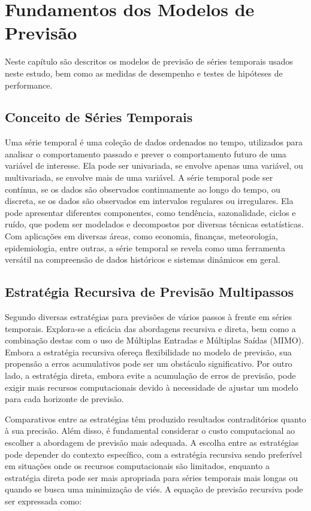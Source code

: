 \section{Fundamentos dos Modelos de Previs\~ao}\label{sec:base}

 Neste capítulo são descritos os modelos de previsão de séries temporais usados neste estudo, bem como as medidas de desempenho e testes de hipóteses de performance. 
 
 \subsection{Conceito de S\'eries Temporais}
 
Uma série temporal é uma coleção de dados ordenados no tempo, utilizados para analisar o comportamento passado e prever o comportamento futuro de uma variável de interesse. Ela pode ser univariada, se envolve apenas uma variável, ou multivariada, se envolve mais de uma variável. A série temporal pode ser contínua, se os dados são observados continuamente ao longo do tempo, ou discreta, se os dados são observados em intervalos regulares ou irregulares. Ela pode apresentar diferentes componentes, como tendência, sazonalidade, ciclos e ruído, que podem ser modelados e decompostos por diversas técnicas estatísticas. Com aplicações em diversas áreas, como economia, finanças, meteorologia, epidemiologia, entre outras, a série temporal se revela como uma ferramenta versátil na compreensão de dados históricos e sistemas dinâmicos em geral.

\subsection{Estrat\'egia Recursiva de Previs\~ao Multipassos}

Segundo  diversas estratégias para previsões de vários passos à frente em séries temporais. Explora-se a eficácia das abordagens recursiva e direta, bem como a combinação destas com o uso de Múltiplas Entradas e Múltiplas Saídas (MIMO). Embora a estratégia recursiva ofereça flexibilidade no modelo de previsão, sua propensão a erros acumulativos pode ser um obstáculo significativo. Por outro lado, a estratégia direta, embora evite a acumulação de erros de previsão, pode exigir mais recursos computacionais devido à necessidade de ajustar um modelo para cada horizonte de previsão.

Comparativos entre as estratégias têm produzido resultados contraditórios quanto à sua precisão. Além disso, é fundamental considerar o custo computacional ao escolher a abordagem de previsão mais adequada. A escolha entre as estratégias pode depender do contexto específico, com a estratégia recursiva sendo preferível em situações onde os recursos computacionais são limitados, enquanto a estratégia direta pode ser mais apropriada para séries temporais mais longas ou quando se busca uma minimização de viés.
A equação de previsão recursiva pode ser expressada como:


